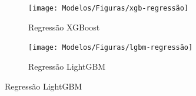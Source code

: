 \begin{figure}[H]
	\centering
	\caption{A performance da regressão utilizando XGBoost e LightGBM é comparada}
	\label{fig:1-xgb-regressao}
	
	\begin{subfigure}{1\textwidth}
			\texttt{[image: Modelos/Figuras/xgb-regressão]}
			\caption{Regressão XGBoost}	\label{fig:xgb}
		\end{subfigure}\hfill
	\begin{subfigure}{1\textwidth}
			\texttt{[image: Modelos/Figuras/lgbm-regressão]}
			\caption{Regressão LightGBM}\label{fig:lgb}	
		\end{subfigure}
	

\end{figure}	





